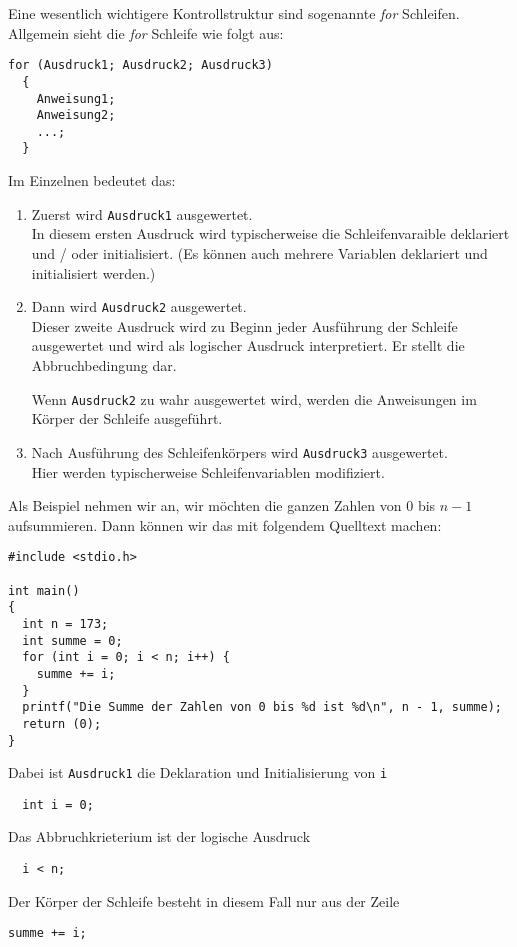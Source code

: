 Eine wesentlich wichtigere Kontrollstruktur sind sogenannte \emph{for} Schleifen.
Allgemein sieht die \emph{for} Schleife wie folgt aus:
\begin{lstlisting}[caption={for Schleife}, belowcaptionskip=0.3em]
for (Ausdruck1; Ausdruck2; Ausdruck3)
  {
    Anweisung1;
    Anweisung2;
    ...;
  }
\end{lstlisting}
Im Einzelnen bedeutet das:
\begin{enumerate}
\item Zuerst wird \texttt{Ausdruck1} ausgewertet.\\
  In diesem ersten Ausdruck wird typischerweise die Schleifenvaraible deklariert und / oder initialisiert.
  (Es können auch mehrere Variablen deklariert und initialisiert werden.)
\item Dann wird \texttt{Ausdruck2} ausgewertet.\\
  Dieser zweite Ausdruck wird zu Beginn jeder Ausführung der Schleife ausgewertet und wird als logischer Ausdruck interpretiert.
  Er stellt die Abbruchbedingung dar.

  Wenn \texttt{Ausdruck2} zu wahr ausgewertet wird, werden die Anweisungen im Körper der Schleife ausgeführt. 
\item Nach Ausführung des Schleifenkörpers wird \texttt{Ausdruck3} ausgewertet.\\
  Hier werden typischerweise Schleifenvariablen modifiziert.
\end{enumerate}
Als Beispiel nehmen wir an, wir möchten die ganzen Zahlen von $0$ bis $n-1$ aufsummieren.
Dann können wir das mit folgendem Quelltext machen:
\begin{lstlisting}
#include <stdio.h>

int main()
{
  int n = 173;
  int summe = 0;
  for (int i = 0; i < n; i++) {
    summe += i;
  }
  printf("Die Summe der Zahlen von 0 bis %d ist %d\n", n - 1, summe);
  return (0);
}
\end{lstlisting}
Dabei ist \texttt{Ausdruck1} die Deklaration und Initialisierung von \verb|i|
\begin{lstlisting}
  int i = 0;
\end{lstlisting}
Das Abbruchkrieterium ist der logische Ausdruck
\begin{lstlisting}
  i < n;
\end{lstlisting}
Der Körper der Schleife besteht in diesem Fall nur aus der Zeile
\begin{lstlisting}
summe += i;
\end{lstlisting}
